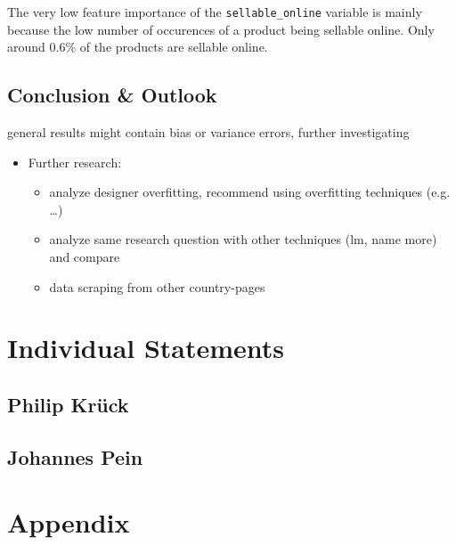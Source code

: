 \documentclass[a4paper, nobind]{templates/ociamthesis}
\providecommand{\tightlist}{%
  \setlength{\itemsep}{0pt}\setlength{\parskip}{0pt}}
\begin{document}
The very low feature importance of the \texttt{sellable\_online} variable is mainly because the low number of occurences of a product being sellable online. Only around 0.6\% of the products are sellable online.

\hypertarget{conclusion-outlook}{%
\section{Conclusion \& Outlook}\label{conclusion-outlook}}

general results might contain bias or variance errors, further investigating

\begin{itemize}
\tightlist
\item
  Further research:

  \begin{itemize}
  \tightlist
  \item
    analyze designer overfitting, recommend using overfitting techniques (e.g. \ldots{})
  \item
    analyze same research question with other techniques (lm, name more) and compare
  \item
    data scraping from other country-pages
  \end{itemize}
\end{itemize}

\hypertarget{individual-statements}{%
\chapter{Individual Statements}\label{individual-statements}}

\hypertarget{philip-kruxfcck}{%
\section{Philip Krück}\label{philip-kruxfcck}}

\hypertarget{johannes-pein}{%
\section{Johannes Pein}\label{johannes-pein}}

\startappendices

\hypertarget{appendix}{%
\chapter{Appendix}\label{appendix}}
\end{document}
